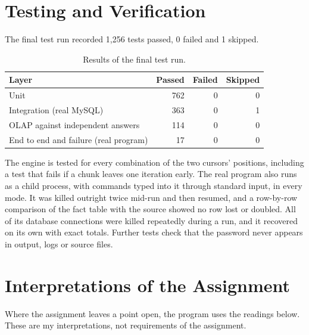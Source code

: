 \documentclass[11pt,a4paper]{article}
\begin{document}
\section{Testing and Verification}

The final test run recorded 1,256 tests passed, 0 failed and 1 skipped.

\begin{table}[ht]\centering
\caption{Results of the final test run.}
\begin{tabular}{lrrr}
\toprule \textbf{Layer} & \textbf{Passed} & \textbf{Failed} & \textbf{Skipped} \\ \midrule
Unit & 762 & 0 & 0 \\
Integration (real MySQL) & 363 & 0 & 1 \\
OLAP against independent answers & 114 & 0 & 0 \\
End to end and failure (real program) & 17 & 0 & 0 \\
\bottomrule\end{tabular}
\end{table}

The engine is tested for every combination of the two cursors' positions, including a test that fails if a chunk leaves one iteration early. The real program also runs as a child process, with commands typed into it through standard input, in every mode. It was killed outright twice mid-run and then resumed, and a row-by-row comparison of the fact table with the source showed no row lost or doubled. All of its database connections were killed repeatedly during a run, and it recovered on its own with exact totals. Further tests check that the password never appears in output, logs or source files.


\section{Interpretations of the Assignment}

Where the assignment leaves a point open, the program uses the readings below. These are my interpretations, not requirements of the assignment.
\end{document}
